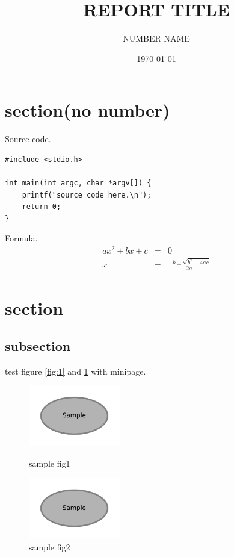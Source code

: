 \documentclass[10pt]{jsarticle}
\begin{document}
\title{REPORT TITLE}
\author{NUMBER NAME}
\date{\today}

\maketitle

\section*{section(no number)}
Source code.
\vspace{5mm}
\begin{lstlisting}[basicstyle=\ttfamily\footnotesize, frame=single]
#include <stdio.h>

int main(int argc, char *argv[]) {
    printf("source code here.\n");
    return 0;
}
\end{lstlisting}
\vspace{5mm}
Formula. 
\begin{eqnarray*}
  ax^2 + bx + c &=& 0\\
  x &=& \frac{-b \pm \sqrt{b^2 - 4ac}}{2a}
\end{eqnarray*}

\section{section}
\subsection{subsection}
test figure \ref{fig:1} and \ref{fig:2} with minipage.
\begin{figure}[htbp]
 \begin{minipage}{0.5\hsize}
  \begin{center}
  \includegraphics[width=40mm]{sample1.pdf}
  \end{center}
  \caption{sample fig1}
  \label{fig:1}
 \end{minipage}
 \begin{minipage}{0.5\hsize}
  \begin{center}
  \includegraphics[width=40mm]{sample2.pdf}
  \end{center}
  \caption{sample fig2}
  \label{fig:2}
 \end{minipage}
\end{figure}
\end{document}

